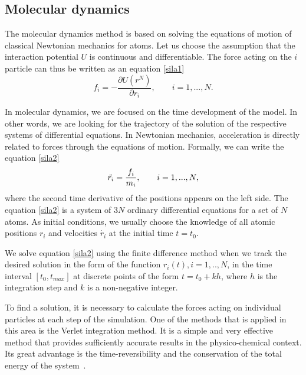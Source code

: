 \subsection{Molecular dynamics}
The molecular dynamics method is based on solving the equations of motion of classical Newtonian mechanics for atoms. Let us choose the assumption that the interaction potential $U$ is continuous and differentiable. The force acting on the $i$ particle can thus be written as an equation \ref{sila1} 
\begin{equation}\label{sila1}
	f_i=-\frac{\partial U(r^N)}{\partial r_i}, \qquad i=1,...,N.
\end{equation}

In molecular dynamics, we are focused on the time development of the model. In other words, we are looking for the trajectory of the solution of the respective systems of differential equations. In Newtonian mechanics, acceleration is directly related to forces through the equations of motion. Formally, we can write the equation \ref{sila2}
\begin{equation}\label{sila2}
	\Ddot{r_i}=\frac{f_i}{m_i}, \qquad i=1,...,N,
\end{equation}
where the second time derivative of the positions appears on the left side. The equation \ref{sila2} is a system of 3$N$ ordinary differential equations for a set of $N$ atoms. As initial conditions, we usually choose the knowledge of all atomic positions $r_i$ and velocities $\dot{r_i}$ at the initial time $t=t_0$. 

We solve equation \ref{sila2} using the finite difference method when we track the desired solution in the form of the function $r_i(t), i=1,..,N$, in the time interval $[t_0,t_{max}]$ at discrete points of the form $t=t_0+kh$, where $h$ is the integration step and $k$ is a non-negative integer.

To find a solution, it is necessary to calculate the forces acting on individual particles at each step of the simulation. One of the methods that is applied in this area is the Verlet integration method. It is a simple and very effective method that provides sufficiently accurate results in the physico-chemical context. Its great advantage is the time-reversibility and the conservation of the total energy of the system~\cite{mdskripta}.

